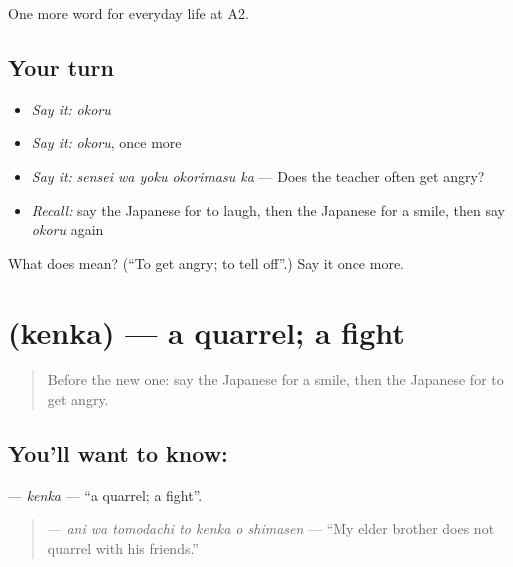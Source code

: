 \begin{grammarlens}[title={What you've built}]
One more word for everyday life at A2.
\end{grammarlens}

\subsection*{Your turn}
\begin{itemize}
\raggedright
  \item \emph{Say it:} \emph{okoru}
  \item \emph{Say it:} \emph{okoru}, once more
  \item \emph{Say it:} \emph{sensei wa yoku okorimasu ka} — Does the teacher often get angry?
  \item \emph{Recall:} say the Japanese for to laugh, then the Japanese for a smile, then say \emph{okoru} again
\end{itemize}

\begin{tcolorbox}[breakable,colback=teal!4,colframe=teal!35!black,title={Before you move on}]
What does  mean? (\textquotedblleft{}To get angry; to tell off\textquotedblright{}.) Say it once more.
\end{tcolorbox}
\section[\texorpdfstring{\ja{けんか} (kenka)}{けんか (kenka)}]{ (kenka) — a quarrel; a fight}

\label{lesson:JA-C246-kenka}



\begin{quote}
Before the new one: say the Japanese for a smile, then the Japanese for to get angry.
\end{quote}

\subsection*{You'll want to know: }
\textbf{} — \emph{kenka} — \textquotedblleft{}a quarrel; a fight\textquotedblright{}.

\begin{quote}
\textbf{   } — \emph{ani wa tomodachi to kenka o shimasen} — \textquotedblleft{}My elder brother does not quarrel with his friends.\textquotedblright{}
\end{quote}

